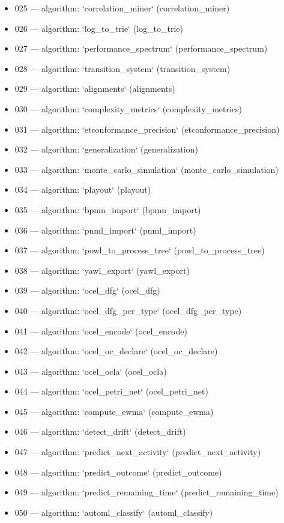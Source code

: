 \begin{itemize}
  \item 025 — algorithm: `correlation\_miner` (correlation\_miner)
  \item 026 — algorithm: `log\_to\_trie` (log\_to\_trie)
  \item 027 — algorithm: `performance\_spectrum` (performance\_spectrum)
  \item 028 — algorithm: `transition\_system` (transition\_system)
  \item 029 — algorithm: `alignments` (alignments)
  \item 030 — algorithm: `complexity\_metrics` (complexity\_metrics)
  \item 031 — algorithm: `etconformance\_precision` (etconformance\_precision)
  \item 032 — algorithm: `generalization` (generalization)
  \item 033 — algorithm: `monte\_carlo\_simulation` (monte\_carlo\_simulation)
  \item 034 — algorithm: `playout` (playout)
  \item 035 — algorithm: `bpmn\_import` (bpmn\_import)
  \item 036 — algorithm: `pnml\_import` (pnml\_import)
  \item 037 — algorithm: `powl\_to\_process\_tree` (powl\_to\_process\_tree)
  \item 038 — algorithm: `yawl\_export` (yawl\_export)
  \item 039 — algorithm: `ocel\_dfg` (ocel\_dfg)
  \item 040 — algorithm: `ocel\_dfg\_per\_type` (ocel\_dfg\_per\_type)
  \item 041 — algorithm: `ocel\_encode` (ocel\_encode)
  \item 042 — algorithm: `ocel\_oc\_declare` (ocel\_oc\_declare)
  \item 043 — algorithm: `ocel\_ocla` (ocel\_ocla)
  \item 044 — algorithm: `ocel\_petri\_net` (ocel\_petri\_net)
  \item 045 — algorithm: `compute\_ewma` (compute\_ewma)
  \item 046 — algorithm: `detect\_drift` (detect\_drift)
  \item 047 — algorithm: `predict\_next\_activity` (predict\_next\_activity)
  \item 048 — algorithm: `predict\_outcome` (predict\_outcome)
  \item 049 — algorithm: `predict\_remaining\_time` (predict\_remaining\_time)
  \item 050 — algorithm: `automl\_classify` (automl\_classify)

\end{itemize}
